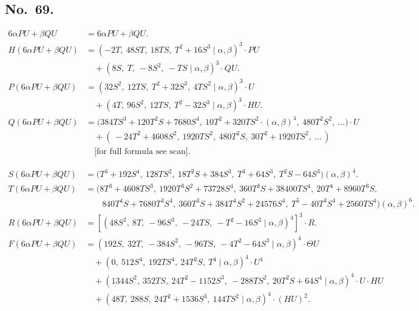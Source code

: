 \documentclass[11pt]{article}
\begin{document}
\subsection*{No.\ 69.}
\begin{align*}
6\alpha PU + \beta QU &= 6\alpha PU + \beta QU. \\[3pt]
H(6\alpha PU + \beta QU) &= (-2T,\ 48 ST,\ 18 TS,\ T^2 + 16 S^3 \mid \alpha, \beta)^3 \cdot PU \\
   &\quad + (8S,\ T,\ -8 S^2,\ -TS \mid \alpha, \beta)^3 \cdot QU. \\[3pt]
P(6\alpha PU + \beta QU) &= (32 S^2,\ 12 TS,\ T^2 + 32 S^3,\ 4 T S^2 \mid \alpha, \beta)^3 \cdot U \\
   &\quad + (4 T,\ 96 S^2,\ 12 T S,\ T^2 - 32 S^3 \mid \alpha, \beta)^3 \cdot HU. \\[3pt]
Q(6\alpha PU + \beta QU) &= \big( 384 T S^3 + 120 T^2 S + 7680 S^4,\ 10 T^2 + 320 T S^2 \cdot (\alpha,\beta)^4,\ 480 T^2 S^2,\ \ldots \big) \cdot U \\
   &\quad + (\,-24 T^2 + 4608 S^2,\ 1920 T S^2,\ 480 T^2 S,\ 30 T^2 + 1920 T S^2,\ \ldots\,) \\
   &\quad \mbox{[for full formula see scan]}.
\end{align*}

\begin{align*}
S(6\alpha PU + \beta QU) &= \big(T^3 + 192 S^4,\ 128 T S^2,\ 18 T^2 S + 384 S^3,\ T^3 + 64 S^3,\ T^2 S - 64 S^3\big)(\alpha, \beta)^4. \\[3pt]
T(6\alpha PU + \beta QU) &= \big(8 T^3 + 4608 T S^3,\ 1920 T^3 S^2 + 73728 S^4,\ 360 T^3 S + 38400 T S^4,\ 20 T^4 + 8960 T^3 S, \\
   &\qquad 840 T^4 S + 7680 T^3 S^4,\ 360 T^3 S + 384 T^4 S^2 + 24576 S^4,\ T^5 - 40 T^3 S^4 + 2560 T S^4\big) (\alpha, \beta)^6. \\[3pt]
R(6\alpha PU + \beta QU) &= [(48 S^2,\ 8 T,\ -96 S^3,\ -24 T S,\ -T^2 - 16 S^3 \mid \alpha, \beta)^4]^3 \cdot R. \\[3pt]
F(6\alpha PU + \beta QU) &= (192 S,\ 32 T,\ -384 S^2,\ -96 T S,\ -4 T^2 - 64 S^3 \mid \alpha, \beta)^4 \cdot \Theta U \\
   &\quad + (0,\ 512 S^4,\ 192 T S^4,\ 24 T^2 S,\ T^4 \mid \alpha, \beta)^4 \cdot U^4 \\
   &\quad + (1344 S^2,\ 352 T S,\ 24 T^2 - 1152 S^3,\ -288 T S^2,\ 20 T^2 S + 64 S^4 \mid \alpha, \beta)^4 \cdot U \cdot HU \\
   &\quad + (48 T,\ 288 S,\ 24 T^2 + 1536 S^3,\ 144 T S^2 \mid \alpha, \beta)^4 \cdot (HU)^2.
\end{align*}
\end{document}
